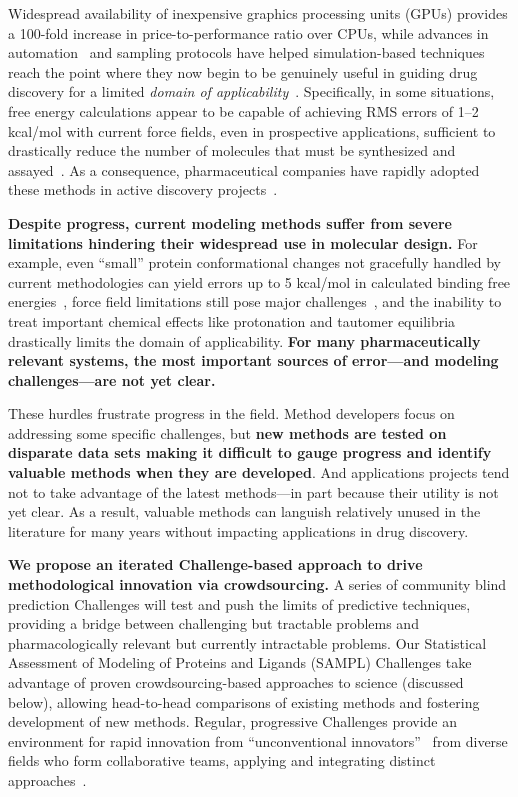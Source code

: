 \documentclass[11pt]{article}
\begin{document}
Widespread availability of inexpensive graphics processing units (GPUs) provides a 100-fold increase in price-to-performance ratio over CPUs, while advances in automation~\cite{liu_lead_2013} and sampling protocols have helped simulation-based techniques reach the point where they now begin to be genuinely useful in guiding drug discovery for a limited \emph{domain of applicability}~\cite{mikulskis_large-scale_2014, homeyer_binding_2014, Sherborne:2016:JComputAidedMolDes,  schrodinger_accurate_2015, christ_binding_2016, cui_affinity_2016, verras_free_2016}.
Specifically, in some situations, free energy calculations appear to be capable of achieving RMS errors of 1--2 kcal/mol with current force fields, even in prospective applications, sufficient to drastically reduce the number of molecules that must be synthesized and assayed~\cite{shirts_free-energy_2010, Aldeghi:2017:J.Am.Chem.Soc., schrodinger_accurate_2015}.
As a consequence, pharmaceutical companies have rapidly adopted these methods in active discovery projects~\cite{Sherborne:2016:JComputAidedMolDes}.

\textbf{Despite progress, current modeling methods suffer from severe limitations hindering their widespread use in molecular design.}
For example, even ``small'' protein conformational changes not gracefully handled by current methodologies can yield errors up to 5 kcal/mol in calculated binding free energies~\cite{lim_sensitivity_2016}, force field limitations still pose major challenges~\cite{rocklin_blind_2013}, and the inability to treat important chemical effects like protonation and tautomer equilibria drastically limits the domain of applicability.
{\bf For many pharmaceutically relevant systems, the most important sources of error---and modeling challenges---are not yet clear.~\cite{Sherborne:2016:JComputAidedMolDes}}

These hurdles frustrate progress in the field. 
Method developers focus on addressing some specific challenges, but {\bf new methods are tested on disparate data sets making it difficult to gauge progress and identify valuable methods when they are developed}.
And applications projects tend not to take advantage of the latest methods---in part because their utility is not yet clear. 
As a result, valuable methods can languish relatively unused in the literature for many years without impacting applications in drug discovery.

{\bf We propose an iterated Challenge-based approach to drive methodological innovation via crowdsourcing.} 
A series of community blind prediction Challenges will test and push the limits of predictive techniques, providing a bridge between challenging but tractable problems and pharmacologically relevant but currently intractable problems.
Our Statistical Assessment of Modeling of Proteins and Ligands (SAMPL) Challenges take advantage of proven crowdsourcing-based approaches to science (discussed below), allowing head-to-head comparisons of existing methods and fostering development of new methods.
Regular, progressive Challenges provide an environment for rapid innovation from ``unconventional innovators''~\cite{Kay:2011:R&DManage} from diverse fields who form collaborative teams, applying and integrating distinct approaches~\cite{Saez-Rodriguez:2016:NatRevGenet}.
\end{document}
